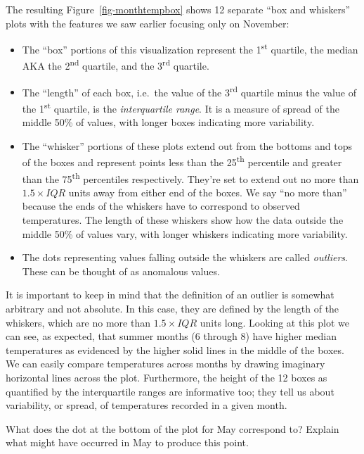 \documentclass[
  letterpaper,
  DIV=11,
  numbers=noendperiod]{scrreprt}
\theoremstyle{definition}
\theoremstyle{remark}
\begin{document}
The resulting Figure~\ref{fig-monthtempbox} shows 12 separate ``box and
whiskers'' plots with the features we saw earlier focusing only on
November:

\begin{itemize}
\item
  The ``box'' portions of this visualization represent the
  1\textsuperscript{st} quartile, the median AKA the
  2\textsuperscript{nd} quartile, and the 3\textsuperscript{rd}
  quartile.
\item
  The ``length'' of each box, i.e.~the value of the
  3\textsuperscript{rd} quartile minus the value of the
  1\textsuperscript{st} quartile, is the \emph{interquartile range}. It
  is a measure of spread of the middle 50\% of values, with longer boxes
  indicating more variability.
\item
  The ``whisker'' portions of these plots extend out from the bottoms
  and tops of the boxes and represent points less than the
  25\textsuperscript{th} percentile and greater than the
  75\textsuperscript{th} percentiles respectively. They're set to extend
  out no more than \(1.5 \times IQR\) units away from either end of the
  boxes. We say ``no more than'' because the ends of the whiskers have
  to correspond to observed temperatures. The length of these whiskers
  show how the data outside the middle 50\% of values vary, with longer
  whiskers indicating more variability.
\item
  The dots representing values falling outside the whiskers are called
  \emph{outliers}. These can be thought of as anomalous values.
\end{itemize}

It is important to keep in mind that the definition of an outlier is
somewhat arbitrary and not absolute. In this case, they are defined by
the length of the whiskers, which are no more than \(1.5 \times IQR\)
units long. Looking at this plot we can see, as expected, that summer
months (6 through 8) have higher median temperatures as evidenced by the
higher solid lines in the middle of the boxes. We can easily compare
temperatures across months by drawing imaginary horizontal lines across
the plot. Furthermore, the height of the 12 boxes as quantified by the
interquartile ranges are informative too; they tell us about
variability, or spread, of temperatures recorded in a given month.

\begin{tcolorbox}[enhanced jigsaw, colback=white, toprule=.15mm, bottomrule=.15mm, titlerule=0mm, title={{🎯} Learning Check 2.22}, leftrule=.75mm, arc=.35mm, left=2mm, colframe=quarto-callout-tip-color-frame, coltitle=black, opacitybacktitle=0.6, bottomtitle=1mm, colbacktitle=quarto-callout-tip-color!10!white, opacityback=0, toptitle=1mm, rightrule=.15mm, breakable]

What does the dot at the bottom of the plot for May correspond to?
Explain what might have occurred in May to produce this point.

\end{tcolorbox}
\end{document}
